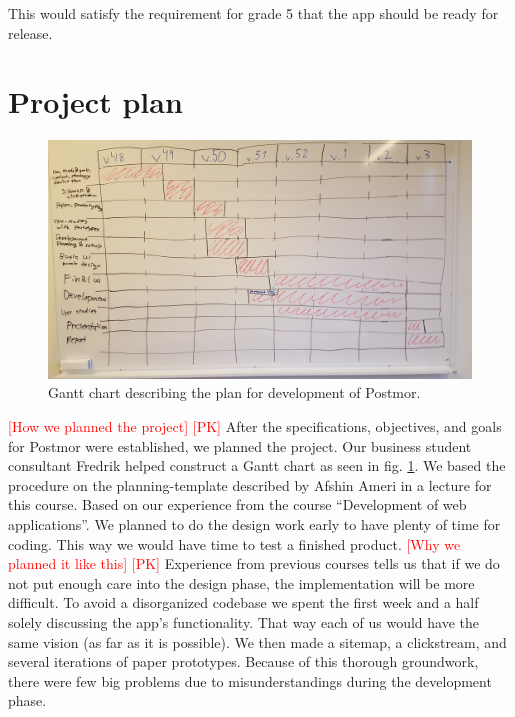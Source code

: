 \documentclass[acmlarge, review=false, screen=true]{acmart}
\begin{document}
    This would satisfy the requirement for grade 5 that the app should be ready for release.

  \section{Project plan}
      \begin{figure}
      \includegraphics[width=\textwidth]{images/Gantt_schema.jpg}
      \caption{Gantt chart describing the plan for development of Postmor.}
      \label{fig:gantt}
    \end{figure} 
    \textcolor{red}{[How we planned the project] [PK]} \newline
    After the specifications, objectives, and goals for Postmor were established, we planned the project. Our business student consultant Fredrik helped construct a Gantt chart\cite{gantt} as seen in fig. \ref{fig:gantt}. We based the procedure on the planning-template described by Afshin Ameri in a lecture for this course\cite{lecturenotes-mobile}. Based on our experience from the course “Development of web applications”. We planned to do the design work early to have plenty of time for coding. This way we would have time to test a finished product.
\newline\newline
    \textcolor{red}{[Why we planned it like this] [PK]} \newline
    Experience from previous courses tells us that if we do not put enough care into the design phase, the implementation will be more difficult. To avoid a disorganized codebase we spent the first week and a half solely discussing the app’s functionality. That way each of us would have the same vision (as far as it is possible). We then made a sitemap, a clickstream, and several iterations of paper prototypes\cite{lecturenotes-mobile}. Because of this thorough groundwork, there were few big problems due to misunderstandings during the development phase.
\end{document}
